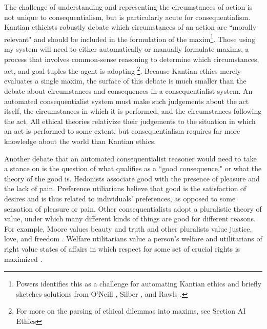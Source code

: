 \begin{isabellebody}
\begin{isamarkuptext}
The challenge of understanding and representing the circumstances of action is not unique to consequentialism,
but is particularly acute for consequentialism. Kantian ethicists robustly debate which circumstances 
of an action are ``morally relevant" and should be included in the formulation of the maxim\footnote{Powers 
\cite{powers} identifies this as a challenge for automating Kantian ethics and briefly sketches 
solutions from O'Neill \cite{constofreason}, Silber \cite{silber}, and Rawls \cite{rawlsconstructivism}. }. Those 
using my system will need to either automatically or manually formulate maxims, a process that involves 
common-sense reasoning to determine which circumstances, act, and goal tuples the agent is adopting
\footnote{For more on the parsing of ethical dilemmas into maxims, see Section AI Ethics}.
Because Kantian ethics merely evaluates a single maxim, the surface of this debate is much smaller
than the debate about circumstances and consequences in a consequentialist system. An automated 
consequentialist system must make such judgements about the act itself, the circumstances in which 
it is performed, and the circumstances following the act. All ethical theories relativize
their judgements to the situation in which an act is performed to some extent, but consequentialism
requires far more knowledge about the world than Kantian ethics.%
\end{isamarkuptext}\isamarkuptrue%
%
\isadelimdocument
%
\endisadelimdocument
%
\isatagdocument
%
\isamarkuptrue%
%
\endisatagdocument
{\isafolddocument}%
%
\isadelimdocument
%
\endisadelimdocument
%
\begin{isamarkuptext}%
Another debate that an automated consequentialist reasoner would need to take a stance on is
the question of what qualifies as a ``good consequence," or what the theory of the good is. Hedonists associate
good with the presence of pleasure and the lack of pain. Preference utiliarians believe that good is 
the satisfaction of desires and is thus related to individuals' preferences, as opposed to some
sensation of pleasure or pain. Other consequentialists adopt a pluralistic theory of value, under which 
many different kinds of things are good for different reasons. For example, Moore values beauty and truth 
and other pluralists value justice, love, and freedom \cite{moorepe}. Welfare utilitarians value a person's 
welfare and utilitarians of right value states of affairs in which respect for some set of crucial
rights is maximized \cite{consequentialismsep}.


\end{isamarkuptext}
\end{isabellebody}
